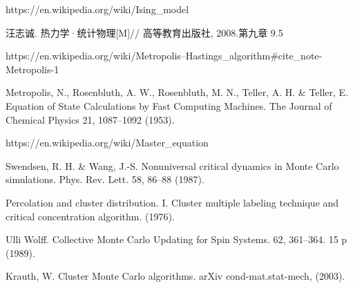 \documentclass[12pt]{article} %
\begin{document}
\clearpage
\renewcommand\refname{参考文献}
\begin{thebibliography}{99}

        https://en.wikipedia.org/wiki/Ising\_model

        汪志诚. 热力学·统计物理[M]// 高等教育出版社, 2008.第九章 9.5

        https://en.wikipedia.org/wiki/Metropolis–Hastings\_algorithm\#cite\_note-Metropolis-1

        Metropolis, N., Rosenbluth, A. W., Rosenbluth, M. N., Teller, A. H. \& Teller, E. Equation of State Calculations by Fast Computing Machines. The Journal of Chemical Physics 21, 1087–1092 (1953).

        https://en.wikipedia.org/wiki/Master\_equation

        Swendsen, R. H. \& Wang, J.-S. Nonuniversal critical dynamics in Monte Carlo simulations. Phys. Rev. Lett. 58, 86–88 (1987).

        Percolation and cluster distribution. I. Cluster multiple labeling technique and critical concentration algorithm. (1976).

        Ulli Wolff. Collective Monte Carlo Updating for Spin Systems. 62, 361–364. 15 p (1989).

        Krauth, W. Cluster Monte Carlo algorithms. arXiv cond-mat.stat-mech, (2003).

\end{thebibliography}
\end{document}
